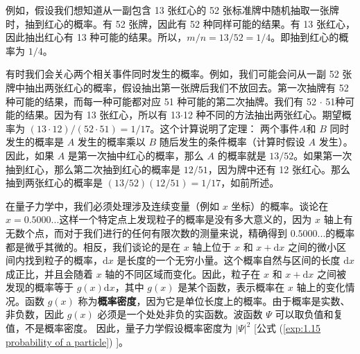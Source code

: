 	例如，假设我们想知道从一副包含 13 张红心的 52 张标准牌中随机抽取一张牌时，抽到红心的概率。有 52 张牌，因此有 52 种同样可能的结果。有 13 张红心，因此抽出红心有 13 种可能的结果。所以，$m/n = 13/52 = 1/4 $。即抽到红心的概率为 $1/4$。

	有时我们会关心两个相关事件同时发生的概率。例如，我们可能会问从一副 52 张牌中抽出两张红心的概率，假设抽出第一张牌后我们不放回去。第一次抽牌有 52 种可能的结果，而每一种可能都对应 51 种可能的第二次抽牌。我们有 52 $\cdot$ 51种可能的结果。因为有 13 张红心，所以有 13$\cdot$12 种不同的方法抽出两张红心。期望概率为 $\left(13\cdot12\right)/\left(52\cdot51\right)=1/17$。这个计算说明了定理： 两个事件$A$和 $B$ 同时发生的概率是 $A$ 发生的概率乘以 $B$ 随后发生的条件概率（计算时假设 $A$ 发生）。因此，如果 $A$ 是第一次抽中红心的概率，那么 $A$ 的概率就是 $13/52$。如果第一次抽到红心，那么第二次抽到红心的概率是 $12/51$，因为牌中还有 12 张红心。那么抽到两张红心的概率是 $\left(13/52\right)\left(12/51\right)=1/17$，如前所述。

	在量子力学中，我们必须处理涉及连续变量（例如 $x$ 坐标）的概率。谈论在 $x=0.5000...$这样一个特定点上发现粒子的概率是没有多大意义的，因为 $x$ 轴上有无数个点，而对于我们进行的任何有限次数的测量来说，精确得到 $0.5000...$的概率都是微乎其微的。相反，我们谈论的是在 $x$ 轴上位于 $x$ 和 $x+\mathrm{d}x$ 之间的微小区间内找到粒子的概率，$\mathrm{d}x$ 是长度的一个无穷小量。这个概率自然与区间的长度 $\mathrm{d}x$ 成正比，并且会随着 $x$ 轴的不同区域而变化。因此，粒子在 $x$ 和 $x+\mathrm{d}x$ 之间被发现的概率等于 $g\left(x\right)\mathrm{d}x$，其中 $g\left(x\right)$ 是某个函数，表示概率在 $x$ 轴上的变化情况。函数 $g\left(x\right)$ 称为\textbf{概率密度}，因为它是单位长度上的概率。由于概率是实数、非负数，因此 $g\left(x\right)$ 必须是一个处处非负的实函数。波函数 $\Psi$ 可以取负值和复值，不是概率密度。 因此，量子力学假设概率密度为 $\left|\Psi\right|^2$ [公式 (\ref{exp:1.15 probability of a particle}) ]。

